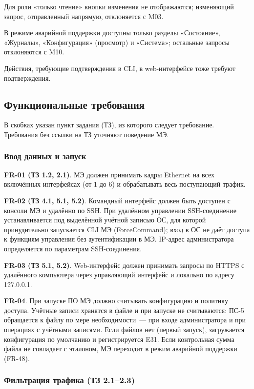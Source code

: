 \documentclass[13pt,a4paper,final]{article}
\begin{document}
	Для роли «только чтение» кнопки изменения не отображаются; изменяющий запрос, отправленный напрямую, отклоняется с M03.
	
	В режиме аварийной поддержки доступны только разделы «Состояние», «Журналы», «Конфигурация» (просмотр) и «Система»; остальные запросы отклоняются с M10.
	
	Действия, требующие подтверждения в CLI, в web-интерфейсе тоже требуют подтверждения.
	
	\subsection{Функциональные требования}
	В скобках указан пункт задания (ТЗ), из которого следует требование. Требования без ссылки на ТЗ уточняют поведение МЭ.
	
	\subsubsection{Ввод данных и запуск}
	
	\textbf{FR-01 (ТЗ 1.2, 2.1)}. МЭ должен принимать кадры Ethernet на всех включённых интерфейсах (от 1 до 6) и обрабатывать весь поступающий трафик.
	
	\textbf{FR-02 (ТЗ 4.1, 5.1, 5.2)}. Командный интерфейс должен быть доступен с консоли МЭ и удалённо по SSH. При удалённом управлении SSH-соединение устанавливается под выделённой учётной записью ОС, для которой принудительно запускается CLI МЭ (ForceCommand); вход в ОС не даёт доступа к функциям управления без аутентификации в МЭ. IP-адрес администратора определяется по параметрам SSH-соединения.
	
	\textbf{FR-03 (ТЗ 5.1, 5.2)}. Web-интерфейс должен принимать запросы по HTTPS с удалённого компьютера через управляющий интерфейс и локально по адресу 127.0.0.1.
	
	\textbf{FR-04}. При запуске ПО МЭ должно считывать конфигурацию и политику доступа. \textcolor{edit}{Учётные записи хранятся в файле и при запуске не считываются: ПС-5 обращается к файлу по мере необходимости~--- при входе администратора и при операциях с учётными записями.} Если файлов нет (первый запуск), загружается конфигурация по умолчанию и регистрируется E31. Если контрольная сумма файла не совпадает с эталоном, МЭ переходит в режим аварийной поддержки (FR-48).
	
	\subsubsection{Фильтрация трафика (ТЗ 2.1–2.3)}
	
\end{document}
